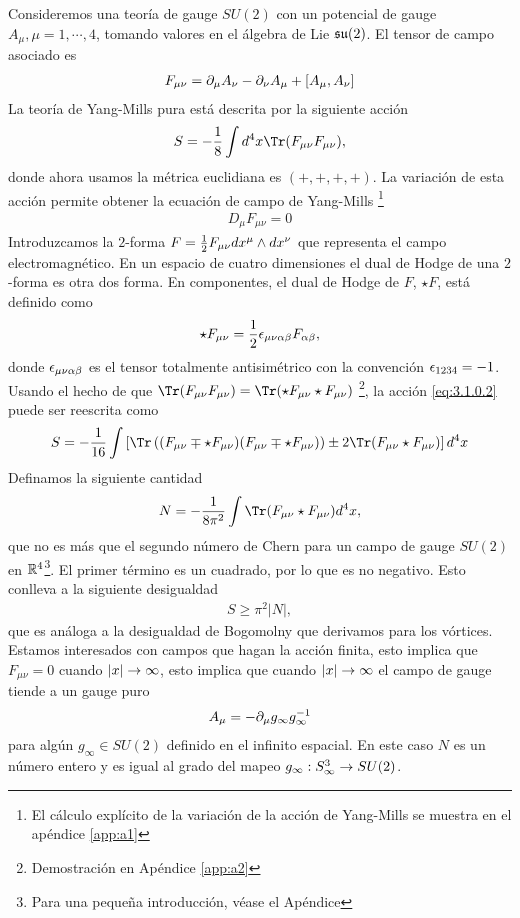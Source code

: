 Consideremos una teoría de gauge $SU(2)$ con un potencial de gauge $A_\mu, \mu=1,\cdots,4$, tomando valores en el álgebra de Lie $\mathfrak{su}(2)$. El tensor de campo asociado es
\begin{align}
	F_{\mu\nu} = \partial_\mu A_\nu-\partial_\nu A_\mu+[A_\mu,A_\nu] \label{eq:3.1.0.1}
\end{align}
La teoría de Yang-Mills pura está descrita por la siguiente acción
\begin{align}
	S=-\f 18\int d^4x \Tr(F_{\mu\nu}F_{\mu\nu}), \label{eq:3.1.0.2}
\end{align}
donde ahora usamos la métrica euclidiana es $(+,+,+,+)$. La variación de esta acción permite obtener la ecuación de campo de Yang-Mills \footnote{El cálculo explícito de la variación de la acción de Yang-Mills se muestra en el apéndice \ref{app:a1}}
\begin{align}
	D_\mu F_{\mu\nu} =0 \label{eq:3.1.0.3}
\end{align}
Introduzcamos la $2$-forma $F=\frac{1}{2}F_{\mu\nu}dx^\mu\wedge dx^\nu$ que representa el campo electromagnético. En un espacio de cuatro dimensiones el dual de Hodge de una $2$-forma es otra dos forma. En componentes, el dual de Hodge de $F$, $\star F$, está definido como
\begin{align}
	\star F_{\mu\nu} = \frac{1}{2}\epsilon_{\mu\nu\alpha\beta}F_{\alpha\beta},  \label{eq:3.1.0.4}
\end{align}
donde $\epsilon_{\mu\nu\alpha\beta}$ es el tensor totalmente antisimétrico con la convención $\epsilon_{1234}=-1$. Usando el hecho de que $\Tr(F_{\mu\nu}F_{\mu\nu})=\Tr(\star F_{\mu\nu}\star F_{\mu\nu})$ \footnote{Demostración en Apéndice \ref{app:a2} }, la acción \eqref{eq:3.1.0.2} puede ser reescrita como
\begin{align}
	S = -\f 1{16}\int\bb{\Tr\bp{(F_{\mu\nu}\mp\star F_{\mu\nu})(F_{\mu\nu}\mp\star F_{\mu\nu})}\pm 2\Tr(F_{\mu\nu}\star F_{\mu\nu})}d^4x \label{eq:3.1.0.5}
\end{align}
Definamos la siguiente cantidad
\begin{align}
	N = -\f{1}{8\pi^2}\int\Tr(F_{\mu\nu}\star F_{\mu\nu})d^4x, \label{eq:3.1.0.6}
\end{align}
que no es más que el segundo número de Chern para un campo de gauge $SU(2)$ en $\mathbb{R}^4$\footnote{Para una pequeña introducción, véase el Apéndice}. El primer término es un cuadrado, por lo que es no negativo. Esto conlleva a la siguiente desigualdad
\begin{align}
	S\geq\pi^2|N|, \label{eq:3.1.0.7}
\end{align}
que es análoga a la desigualdad de Bogomolny que derivamos para los vórtices. Estamos interesados con campos que hagan la acción finita, esto implica que $F_{\mu\nu}=0$ cuando $|x|\rightarrow\infty$, esto implica que cuando $|x|\rightarrow\infty$ el campo de gauge tiende a un gauge puro
\begin{align}
	A_\mu = -\partial_\mu g_{\infty}g_\infty^{-1} \label{eq:3.1.0.7}
\end{align}
para algún $g_\infty\in SU(2)$ definido en el infinito espacial. En este caso $N$ es un número entero y es igual al grado del mapeo $g_\infty: S_\infty^3\rightarrow SU(2)$.

